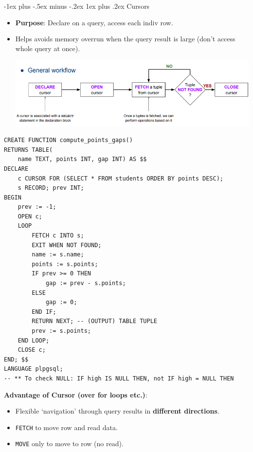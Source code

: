 \documentclass[12pt, landscape]{article}
\makeatletter
\newcommand{\code}[1]{\colorbox{gray!25!}{\lstinline|#1|}}
\renewcommand{\subsubsection}{\@startsection{subsubsection}{3}{0.1mm}%
                                {-1ex plus -.5ex minus -.2ex}%
                                {1ex plus .2ex}%
                                {\normalfont\small\bfseries}}
\makeatother
\begin{document}
\begin{multicols*}{3}
\subsubsection{Cursors}
\begin{itemize}
\item  \textbf{Purpose}: Declare on a query, access each indiv row. 
\item Helps avoids memory overrun when the query result is large (don't access whole query at once). \\
\centerline{\includegraphics[width=1 \linewidth]{cursorworkflow}}
\end{itemize}
\begin{lstlisting}
CREATE FUNCTION compute_points_gaps()
RETURNS TABLE(
    name TEXT, points INT, gap INT) AS $$
DECLARE
    c CURSOR FOR (SELECT * FROM students ORDER BY points DESC);
    s RECORD; prev INT;
BEGIN
    prev := -1;
    OPEN c;
    LOOP
        FETCH c INTO s;
        EXIT WHEN NOT FOUND;
        name := s.name;
        points := s.points;
        IF prev >= 0 THEN
            gap := prev - s.points;
        ELSE
            gap := 0;
        END IF;
        RETURN NEXT; -- (OUTPUT) TABLE TUPLE
        prev := s.points;
    END LOOP;
    CLOSE c;
END; $$
LANGUAGE plpgsql;
-- ** To check NULL: IF high IS NULL THEN, not IF high = NULL THEN
\end{lstlisting}

\textbf{Advantage of Cursor (over for loops etc.)}:

\begin{itemize}
	\item Flexible `navigation' through query results in \textbf{different directions}.
	\item \code{FETCH} to move row and read data.
	\item \code{MOVE} only to move to row (no read).
\end{itemize}


\end{multicols*}
\end{document}
